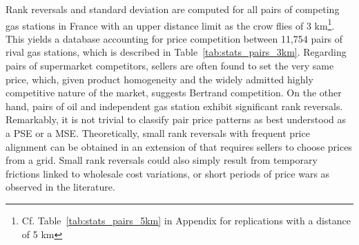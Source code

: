 \documentclass[english]{article}
\begin{document}
Rank reversals and standard deviation are computed for all pairs of competing gas stations in France with an upper distance limit as the crow flies of 3 km\footnote{Cf. Table~\ref{tab:stats_pairs_5km} in Appendix for replications with a distance of 5 km}. This yields a database accounting for price competition between 11,754 pairs of rival gas stations, which is described in Table~\ref{tab:stats_pairs_3km}. Regarding pairs of supermarket competitors, sellers are often found to set the very same price, which, given product homogeneity and the widely admitted  highly competitive nature of the market, suggests Bertrand competition. On the other hand, pairs of oil and independent gas station exhibit significant rank reversals. Remarkably, it is not trivial to classify pair price patterns as best understood as a PSE or a MSE. Theoretically, small rank reversals with frequent price alignment can be obtained in an extension of \cite{VAR80} that requires sellers to choose prices from a grid. Small rank reversals could also simply result from temporary frictions linked to wholesale cost variations, or short periods of price wars as observed in the literature.
\end{document}
